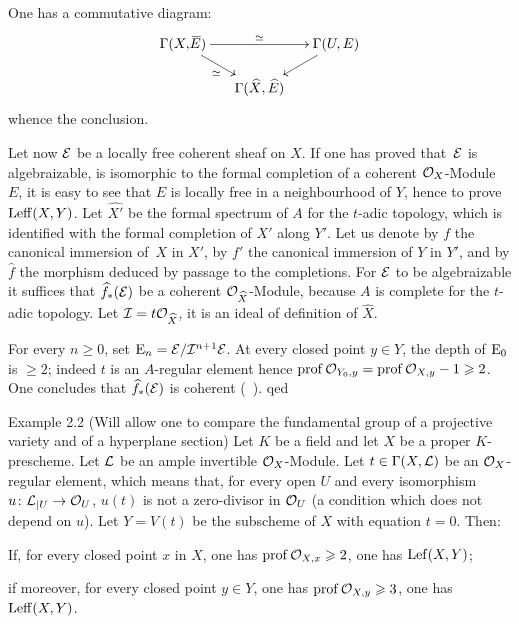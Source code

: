 One has a commutative diagram:
\[
\UseTips \newdir{ >}{!/-5pt/\dir{>}} \xymatrix@=5mm{ \Gamma(X, \overline{\!E})\ar[rr]^{\simeq}\ar[dr]_{\simeq} && \Gamma(U, E)\ar[dl]\\
&\Gamma(\hat{X}, \hat{E})}
\]
whence the conclusion.

Let now ${\mathcal E}$ be a locally free coherent sheaf on $\hat{X}$. If one has
proved that~${\mathcal E}$ is algebraizable, \ie is isomorphic to the formal
completion of a coherent $\mathcal{O}_X$-Module~$E$, it is easy to see that $E$
is locally free in a neighbourhood of $Y$, hence to prove
$\operatorname{Leff} (X, Y)$. Let $\widehat{X'}$ be the formal spectrum of $A$ for
the $t$-adic topology, which is identified with the formal completion
of $X'$ along $Y'$. Let us denote by $f$ the canonical immersion of~$X$
in $X'$, by $f'$ the canonical immersion of $Y$ in $Y'$, and by
$\hat{f}$ the morphism deduced by passage to the completions. For
${\mathcal E}$ to be algebraizable it suffices that $\widehat{f}_\ast({\mathcal E})$ be a
coherent ${\mathcal O}_{\widehat{X}}$-Module, because $A$ is complete for the
$t$-adic topology. Let ${\mathcal I} = t{\mathcal O}_{\widehat{X}}$, it is an ideal of
definition of $\hat{X}$.

For every $n\geq 0$, set $\operatorname{E}_n={\mathcal E}/{\mathcal I}^{n+1}{\mathcal E}$. At every closed point
$y\in Y$, the depth of $\operatorname{E}_0$ is $\geq 2$; indeed $t$ is an $A$-regular
element hence $\operatorname{prof}{\mathcal O}_{Y_0, y}=\operatorname{prof}{\mathcal O}_{X, y}-1\geqslant 2$. One concludes
that $\widehat{f}_\ast({\mathcal E})$ is coherent (~). qed

\label{X.2.2}
\begin{enonce*}[remark]{Example 2.2}
{\normalfont (Will allow one to compare the fundamental group of a projective variety and of a hyperplane section)}
Let $K$ be a field and let $X$ be a proper $K$-prescheme. Let ${\mathcal L}$ be
an ample invertible $\mathcal{O}_X$-Module. Let $t \in \Gamma(X, {\mathcal L})$ be an
$\mathcal{O}_X$-regular element, which means that, for every open $U$ and every
isomorphism $u\colon \Ll_{|U}\to\Oo_U$, \/$u(t)$ is not a zero-divisor
in ${\mathcal O}_U$ (a condition which does not depend on $u$). Let $Y = V(t)$
be the subscheme of $X$ with equation $t = 0$. Then:
\begin{enumeratei}
\item
If, for every closed point $x$ in $X$, one has
$\operatorname{prof}{\mathcal O}_{X, x}\geqslant 2$, one has $\operatorname{Lef} (X, Y)$;

\item
if moreover, for every closed point $y\in Y$, one has
$\operatorname{prof}{\mathcal O}_{X, y}\geqslant 3$, one has $\operatorname{Leff} (X, Y)$.
\end{enumeratei}
\end{enonce*}

